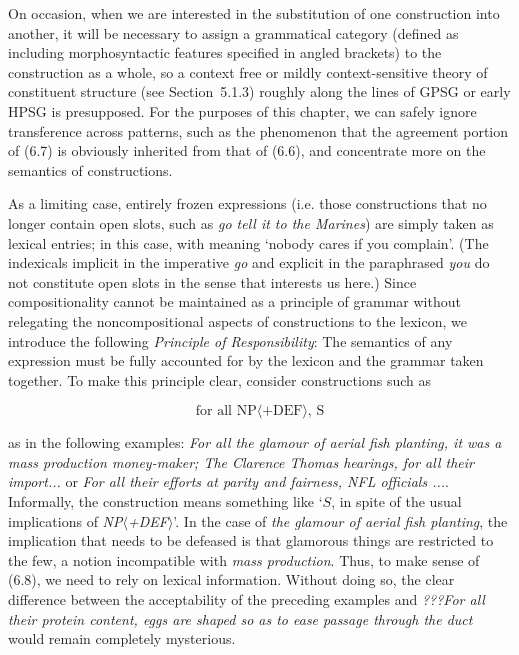\noindent 
On occasion, when we are interested in the substitution of one
construction into another, it will be necessary to assign a grammatical
category (defined as including morphosyntactic features specified in angled
brackets) to the construction as a whole, so a context free or mildly
context-sensitive theory of constituent structure (see Section~5.1.3) roughly
along the lines of GPSG \cite{Gazdar:1985} or early HPSG \cite{Pollard:1984}
is presupposed. For the purposes of this chapter, we can safely ignore
transference across patterns, such as the phenomenon that the agreement
portion of (6.7) is obviously inherited from that of (6.6), and concentrate
more on the semantics of constructions.

As a limiting case, entirely frozen expressions (i.e. those constructions that
no longer contain open slots, such as {\it go tell it to the Marines}) are
simply taken as lexical entries; in this case, with meaning `nobody cares if
you complain'. (The indexicals implicit in the imperative {\it go} and
explicit in the paraphrased {\it you} do not constitute open slots in the
sense that interests us here.) Since compositionality cannot be maintained
as a principle of grammar without relegating the noncompositional aspects of
constructions to the lexicon, we introduce the following {\it Principle of
  Responsibility}: The semantics of any expression must be fully accounted for
by the lexicon and the grammar taken together.  To make this principle clear,
consider constructions such as

\begin{equation}
\text{for all NP$\langle$+DEF$\rangle$, S}
\end{equation}

\noindent 
as in the following examples: {\it For all the glamour of aerial fish
  planting, it was a mass production money-maker; The Clarence Thomas
  hearings, for all their import...} or {\it For all their efforts at parity
  and fairness, NFL officials ...}. Informally, the construction means
something like `$S$, in spite of the usual implications of {\it
  NP$\langle$+DEF$\rangle$}'.  In the case of {\it the glamour of aerial fish
  planting}, the implication that needs to be defeased is that glamorous
things are restricted to the few, a notion incompatible with {\it mass
  production}.  Thus, to make sense of (6.8), we need to rely on lexical
information. Without doing so, the clear difference between the acceptability
of the preceding examples and {\it ???For all their protein content, eggs are
  shaped so as to ease passage through the duct} would remain completely
mysterious.

